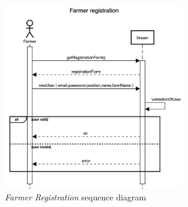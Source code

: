 \begin{enumerate}
            \begin{figure}[H]
                \begin{center}
                \includegraphics[width=0.7\textwidth]{sequence/FarmerRegistration.png}
                \caption{\emph{Farmer Registration} sequence diagram}
                \label{fig:sequence1}
                \end{center}
            \end{figure}


\end{enumerate}
